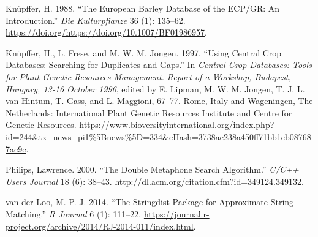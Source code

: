 \documentclass[
]{article}
\begin{document}
\hypertarget{refs}{}
\leavevmode\hypertarget{ref-knupffer1988european}{}%
Knüpffer, H. 1988. ``The European Barley Database of the ECP/GR: An
Introduction.'' \emph{Die Kulturpflanze} 36 (1): 135--62.
\url{https://doi.org/https://doi.org/10.1007/BF01986957}.

\leavevmode\hypertarget{ref-kfj97}{}%
Knüpffer, H., L. Frese, and M. W. M. Jongen. 1997. ``Using Central Crop
Databases: Searching for Duplicates and Gaps.'' In \emph{Central Crop
Databases: Tools for Plant Genetic Resources Management. Report of a
Workshop, Budapest, Hungary, 13-16 October 1996}, edited by E. Lipman,
M. W. M. Jongen, T. J. L. van Hintum, T. Gass, and L. Maggioni, 67--77.
Rome, Italy and Wageningen, The Netherlands: International Plant Genetic
Resources Institute and Centre for Genetic Resources.
\url{https://www.bioversityinternational.org/index.php?id=244\&tx_news_pi1\%5Bnews\%5D=334\&cHash=3738ae238a450ff71bb1cb087687ac9c}.

\leavevmode\hypertarget{ref-p00}{}%
Philips, Lawrence. 2000. ``The Double Metaphone Search Algorithm.''
\emph{C/C++ Users Journal} 18 (6): 38--43.
\url{http://dl.acm.org/citation.cfm?id=349124.349132}.

\leavevmode\hypertarget{ref-van2014stringdist}{}%
van der Loo, M. P. J. 2014. ``The Stringdist Package for Approximate
String Matching.'' \emph{R Journal} 6 (1): 111--22.
\url{https://journal.r-project.org/archive/2014/RJ-2014-011/index.html}.
\end{document}
